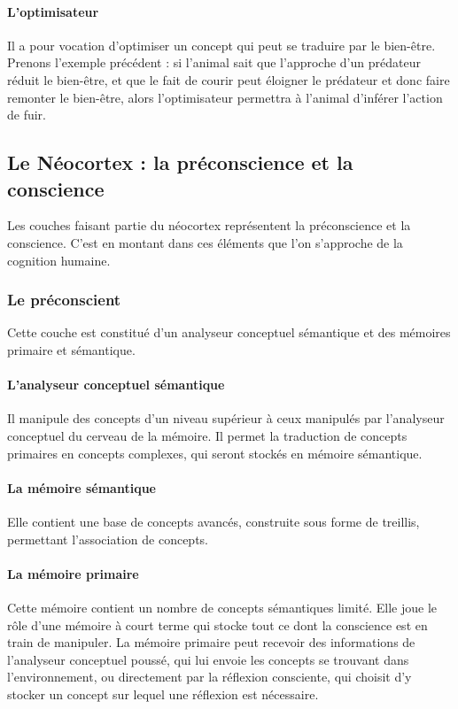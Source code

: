 \paragraph {L’optimisateur} Il a pour vocation d’optimiser un concept qui peut
se traduire par le bien-être. Prenons l’exemple précédent : si l'animal sait que l’approche d’un prédateur réduit le bien-être, et que le fait de courir peut éloigner le
prédateur et donc faire remonter le bien-être, alors l'optimisateur permettra à l'animal d'inférer l’action de fuir.

\subsection{Le Néocortex : la préconscience et la conscience}
Les couches faisant partie du néocortex représentent la préconscience et la
conscience. C'est en montant dans ces éléments que l'on s'approche de la cognition humaine.

\subsubsection{Le préconscient} Cette couche est constitué d'un analyseur
conceptuel sémantique et des mémoires primaire et sémantique.

\paragraph{L'analyseur conceptuel sémantique} Il manipule des concepts d'un niveau
supérieur à ceux manipulés par l’analyseur conceptuel du cerveau de la mémoire. Il permet la
traduction de concepts primaires en concepts complexes, qui seront stockés en mémoire
sémantique.

\paragraph{La mémoire sémantique} Elle contient une base de concepts avancés, construite sous forme de treillis, permettant l'association de concepts.

\paragraph{La mémoire primaire} Cette mémoire contient un nombre de concepts
sémantiques limité. Elle joue le rôle d'une mémoire à court terme qui stocke tout ce dont la conscience est en train de manipuler. La mémoire primaire peut recevoir des informations de l’analyseur conceptuel poussé, qui lui envoie les concepts se trouvant dans l’environnement, ou directement par la réflexion consciente, qui choisit d’y stocker un concept sur lequel une réflexion est nécessaire.


